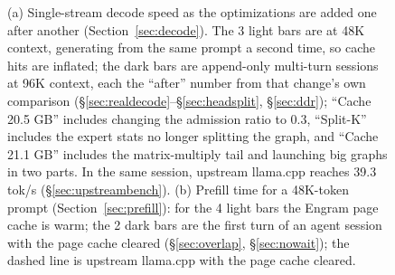 \documentclass[11pt,a4paper]{article}
\newcommand{\tps}{tok/s}
\begin{document}
\begin{figure}[!h]
  \vspace{0.4em}
  \begin{subfigure}[b]{0.66\textwidth}
    \centering
    \caption{}
  \end{subfigure}
  \caption{(a) Single-stream decode speed as the optimizations are added one after another (Section~\ref{sec:decode}). The 3 light bars are at 48K context, generating from the same prompt a second time, so cache hits are inflated; the dark bars are append-only multi-turn sessions at 96K context, each the ``after'' number from that change's own comparison (\S\ref{sec:realdecode}--\S\ref{sec:headsplit}, \S\ref{sec:ddr}); ``Cache 20.5 GB'' includes changing the admission ratio to 0.3, ``Split-K'' includes the expert stats no longer splitting the graph, and ``Cache 21.1 GB'' includes the matrix-multiply tail and launching big graphs in two parts. In the same session, upstream llama.cpp reaches 39.3 \tps{} (\S\ref{sec:upstreambench}). (b) Prefill time for a 48K-token prompt (Section~\ref{sec:prefill}): for the 4 light bars the Engram page cache is warm; the 2 dark bars are the first turn of an agent session with the page cache cleared (\S\ref{sec:overlap}, \S\ref{sec:nowait}); the dashed line is upstream llama.cpp with the page cache cleared.}
  \label{fig:hero}
\end{figure}
\end{document}
